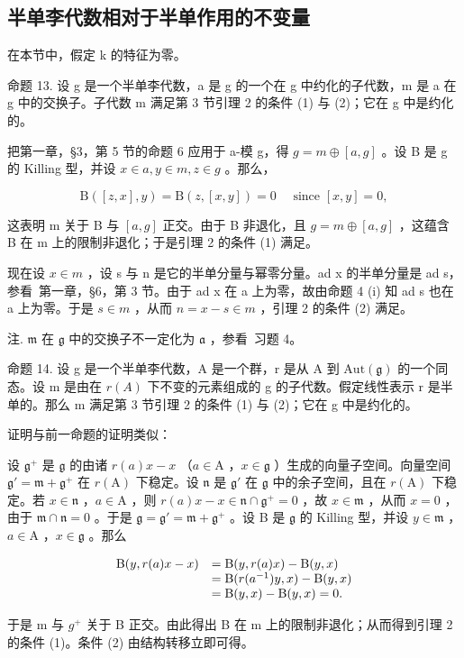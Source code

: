 \subsection{半单李代数相对于半单作用的不变量}

在本节中，假定 k 的特征为零。

命题 13. 设 g 是一个半单李代数，a 是 g 的一个在 g 中约化的子代数，m 是 a 在 g 中的交换子。子代数 m 满足第 3 节引理 2 的条件 (1) 与 (2)；它在 g 中是约化的。

把第一章，§3，第 5 节的命题 6 应用于 a-模 g，得 \(g = m \oplus [a, g]\) 。设 B 是 g 的 Killing 型，并设 \(x \in a, y \in m, z \in g\) 。那么，

\[
\mathrm{B} ([ z, x ], y) = \mathrm{B} (z, [ x, y ]) = 0 \quad \text { since } [ x, y ] = 0,
\]

这表明 m 关于 B 与 \([a,g]\) 正交。由于 B 非退化，且 \(g = m \oplus [a,g]\) ，这蕴含 B 在 m 上的限制非退化；于是引理 2 的条件 (1) 满足。

现在设 \(x \in m\) ，设 s 与 n 是它的半单分量与幂零分量。ad x 的半单分量是 ad s，参看~第一章，§6，第 3 节。由于 ad x 在 a 上为零，故由命题 4 (i) 知 ad s 也在 a 上为零。于是 \(s \in m\) ，从而 \(n = x - s \in m\) ，引理 2 的条件 (2) 满足。

注. \(\mathfrak{m}\) 在 \(\mathfrak{g}\) 中的交换子不一定化为 \(\mathfrak{a}\) ，参看~习题 4。

命题 14. 设 g 是一个半单李代数，A 是一个群，r 是从 A 到 \(\text{Aut}(\mathfrak{g})\) 的一个同态。设 m 是由在 \(r(A)\) 下不变的元素组成的 g 的子代数。假定线性表示 r 是半单的。那么 m 满足第 3 节引理 2 的条件 (1) 与 (2)；它在 g 中是约化的。

证明与前一命题的证明类似：

设 \(\mathfrak{g}^{+}\) 是 \(\mathfrak{g}\) 的由诸 \(r(a)x - x\) （\(a \in \mathrm{A}\) ，\(x \in \mathfrak{g}\) ）生成的向量子空间。向量空间 \(\mathfrak{g}' = \mathfrak{m} + \mathfrak{g}^{+}\) 在 \(r(\mathrm{A})\) 下稳定。设 \(\mathfrak{n}\) 是 \(\mathfrak{g}'\) 在 \(\mathfrak{g}\) 中的余子空间，且在 \(r(\mathrm{A})\) 下稳定。若 \(x \in \mathfrak{n}\) ，\(a \in \mathrm{A}\) ，则 \(r(a)x - x \in \mathfrak{n} \cap \mathfrak{g}^{+} = 0\) ，故 \(x \in \mathfrak{m}\) ，从而 \(x = 0\) ，由于 \(\mathfrak{m} \cap \mathfrak{n} = 0\) 。于是 \(\mathfrak{g} = \mathfrak{g}' = \mathfrak{m} + \mathfrak{g}^{+}\) 。设 B 是 \(\mathfrak{g}\) 的 Killing 型，并设 \(y \in \mathfrak{m}\) ，\(a \in \mathrm{A}\) ，\(x \in \mathfrak{g}\) 。那么

\[
\begin{array}{r l} \mathrm{B} (y, r (a) x - x) & = \mathrm{B} (y, r (a) x) - \mathrm{B} (y, x) \\ & = \mathrm{B} (r (a ^ {- 1}) y, x) - \mathrm{B} (y, x) \\ & = \mathrm{B} (y, x) - \mathrm{B} (y, x) = 0. \end{array}
\]

于是 m 与 \(g^{+}\) 关于 B 正交。由此得出 B 在 m 上的限制非退化；从而得到引理 2 的条件 (1)。条件 (2) 由结构转移立即可得。

